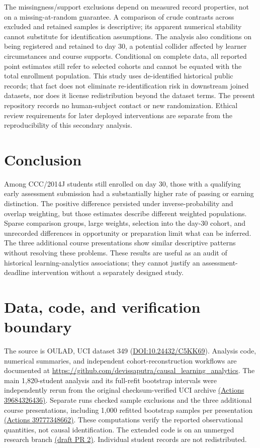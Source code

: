 \documentclass[10pt,a4paper]{article}
\begin{document}
The missingness/support exclusions depend on measured record properties, not on a missing-at-random guarantee. A comparison of crude contrasts across excluded and retained samples is descriptive; its apparent numerical stability cannot substitute for identification assumptions. The analysis also conditions on being registered and retained to day 30, a potential collider affected by learner circumstances and course supports. Conditional on complete data, all reported point estimates still refer to selected cohorts and cannot be equated with the total enrollment population. This study uses de-identified historical public records; that fact does not eliminate re-identification risk in downstream joined datasets, nor does it license redistribution beyond the dataset terms. The present repository records no human-subject contact or new randomization. Ethical review requirements for later deployed interventions are separate from the reproducibility of this secondary analysis.

\section{Conclusion}
Among CCC/2014J students still enrolled on day 30, those with a qualifying early assessment submission had a substantially higher rate of passing or earning distinction. The positive difference persisted under inverse-probability and overlap weighting, but those estimates describe different weighted populations. Sparse comparison groups, large weights, selection into the day-30 cohort, and unrecorded differences in opportunity or preparation limit what can be inferred. The three additional course presentations show similar descriptive patterns without resolving these problems. These results are useful as an audit of historical learning-analytics associations; they cannot justify an assessment-deadline intervention without a separately designed study.

\section*{Data, code, and verification boundary}
The source is OULAD, UCI dataset 349 (\href{https://doi.org/10.24432/C5KK69}{DOI:10.24432/C5KK69}). Analysis code, numerical summaries, and independent cohort-reconstruction workflows are documented at \url{https://github.com/devissaputra/causal_learning_analytics}. The main 1,820-student analysis and its full-refit bootstrap intervals were independently rerun from the original checksum-verified UCI archive \href{https://github.com/devissaputra/causal_learning_analytics/actions/runs/39684326436}{(Actions 39684326436)}. Separate runs checked sample exclusions and the three additional course presentations, including 1,000 refitted bootstrap samples per presentation \href{https://github.com/devissaputra/causal_learning_analytics/actions/runs/39777348662}{(Actions 39777348662)}. These computations verify the reported observational quantities, not causal identification. The extended code is on an unmerged research branch \href{https://github.com/devissaputra/causal_learning_analytics/pull/2}{(draft PR 2)}. Individual student records are not redistributed.
\end{document}
